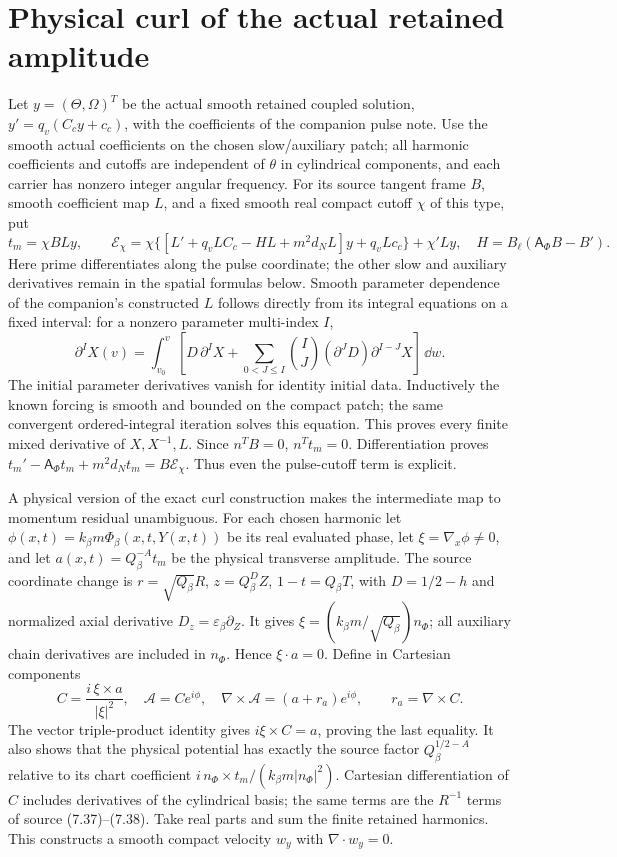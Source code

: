 \section{Physical curl of the actual retained amplitude}
Let $y=(\Theta,\Omega)^T$ be the actual smooth retained coupled solution,
$y'=q_v(C_cy+c_c)$, with the coefficients of the companion pulse note.
Use the smooth actual coefficients on the chosen slow/auxiliary patch;
all harmonic coefficients and cutoffs are independent of $\theta$ in
cylindrical components, and each carrier has nonzero integer angular
frequency. For its source tangent frame $B$, smooth coefficient map $L$,
and a fixed smooth real compact cutoff $\chi$ of this type, put
\[
 t_m=\chi BLy,\qquad
 \mathcal E_\chi=
 \chi\{[L'+q_vLC_c-HL+m^2d_NL]y+q_vLc_c\}+\chi'Ly,
 \quad H=B_\ell(\mathsf A_\Phi B-B').
\]
Here prime differentiates along the pulse coordinate; the other slow
and auxiliary derivatives remain in the spatial formulas below.
Smooth parameter dependence of the companion's constructed $L$ follows
directly from its integral equations on a fixed interval: for a nonzero
parameter multi-index $I$,
\[
 \partial^I X(v)=
 \int_{v_0}^v\left[D\,\partial^I X+
 \sum_{0<J\le I}{I\choose J}(\partial^JD)
                                 \partial^{I-J}X\right]\,\dd w .
\]
The initial parameter derivatives vanish for identity initial data.
Inductively the known forcing is smooth and bounded on the compact patch;
the same convergent ordered-integral iteration solves this equation.
This proves every finite mixed derivative of $X,X^{-1},L$.
Since $n^TB=0$, $n^Tt_m=0$. Differentiation proves
$t_m'-\mathsf A_\Phi t_m+m^2d_Nt_m=B\mathcal E_\chi$.
Thus even the pulse-cutoff term is explicit.

A physical version of the exact curl construction makes the intermediate
map to momentum residual unambiguous. For each chosen harmonic let
$\phi(x,t)=k_\beta m\Phi_\beta(x,t,Y(x,t))$ be its real evaluated phase,
let $\xi=\nabla_x\phi\ne0$, and let $a(x,t)=Q_\beta^{-A}t_m$ be the
physical transverse amplitude. The source coordinate change is
$r=\sqrt{Q_\beta}R$, $z=Q_\beta^D Z$, $1-t=Q_\beta T$,
with $D=1/2-h$ and normalized axial derivative
$D_z=\varepsilon_\beta\partial_Z$. It gives
$\xi=(k_\beta m/\sqrt{Q_\beta})n_\Phi$; all auxiliary chain derivatives
are included in $n_\Phi$. Hence $\xi\cdot a=0$. Define in Cartesian
components
\begin{equation}
 C=\frac{i\,\xi\times a}{|\xi|^2},\quad
 \mathcal A=C e^{i\phi},\quad
 \nabla\times\mathcal A=(a+r_a)e^{i\phi},\qquad
 r_a=\nabla\times C. \label{nsbridge:cb:curl}
\end{equation}
The vector triple-product identity gives
$i\xi\times C=a$, proving the last equality. It also shows that the
physical potential has exactly the source factor $Q_\beta^{1/2-A}$
relative to its chart coefficient
$i\,n_\Phi\times t_m/(k_\beta m|n_\Phi|^2)$.
Cartesian differentiation of $C$ includes derivatives of the cylindrical
basis; the same terms are the $R^{-1}$ terms of source (7.37)--(7.38).
Take real parts and sum the finite retained harmonics. This constructs
a smooth compact velocity $w_y$ with $\nabla\cdot w_y=0$.

